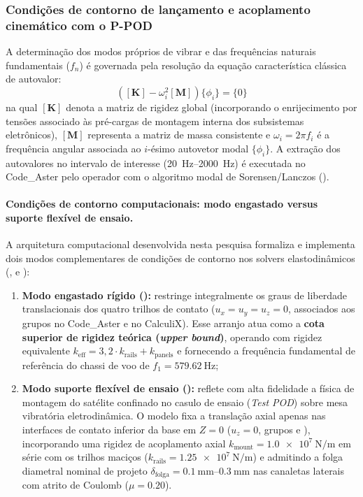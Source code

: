 \subsubsection{Condições de contorno de lançamento e acoplamento cinemático com o P-POD}
\label{subsubsec:modal}

A determinação dos modos próprios de vibrar e das frequências naturais fundamentais ($f_n$) é governada pela resolução da equação característica clássica de autovalor:
\begin{equation}
  \left( [\mathbf{K}] - \omega_i^{2} [\mathbf{M}] \right) \{\phi_i\} = \{0\}
  \label{eq:autovalor}
\end{equation}
na qual $[\mathbf{K}]$ denota a matriz de rigidez global (incorporando o enrijecimento por tensões associado às pré-cargas de montagem interna dos subsistemas eletrônicos), $[\mathbf{M}]$ representa a matriz de massa consistente e $\omega_i = 2\pi f_i$ é a frequência angular associada ao $i$-ésimo autovetor modal $\{\phi_i\}$. A extração dos autovalores no intervalo de interesse (\SIrange{20}{2000}{\hertz}) é executada no Code\_Aster pelo operador  com o algoritmo modal de Sorensen/Lanczos ().

\paragraph*{Condições de contorno computacionais: modo engastado versus suporte flexível de ensaio.}
A arquitetura computacional desenvolvida nesta pesquisa formaliza e implementa dois modos complementares de condições de contorno nos solvers elastodinâmicos (,  e ):
\begin{enumerate}
  \item \textbf{Modo engastado rígido ():} restringe integralmente os graus de liberdade translacionais dos quatro trilhos de contato ($u_x = u_y = u_z = 0$, associados aos grupos  no Code\_Aster e  no CalculiX). Esse arranjo atua como a \textbf{cota superior de rigidez teórica (\textit{upper bound})}, operando com rigidez equivalente $k_{\text{eff}} = 3{,}2 \cdot k_{\text{rails}} + k_{\text{panels}}$ e fornecendo a frequência fundamental de referência do chassi de voo de $f_1 = \SI{579.62}{\hertz}$;
  \item \textbf{Modo suporte flexível de ensaio ():} reflete com alta fidelidade a física de montagem do satélite confinado no casulo de ensaio (\textit{Test POD}) sobre mesa vibratória eletrodinâmica. O modelo fixa a translação axial apenas nas interfaces de contato inferior da base em $Z = 0$ ($u_z = 0$, grupos  e ), incorporando uma rigidez de acoplamento axial $k_{\text{mount}} = \SI{1.0e7}{\newton\per\metre}$ em série com os trilhos maciços ($k_{\text{rails}} = \SI{1.25e7}{\newton\per\metre}$) e admitindo a folga diametral nominal de projeto $\delta_{\text{folga}} = \SIrange{0.1}{0.3}{\milli\metre}$ nas canaletas laterais com atrito de Coulomb ($\mu = \num{0.20}$).
\end{enumerate}

